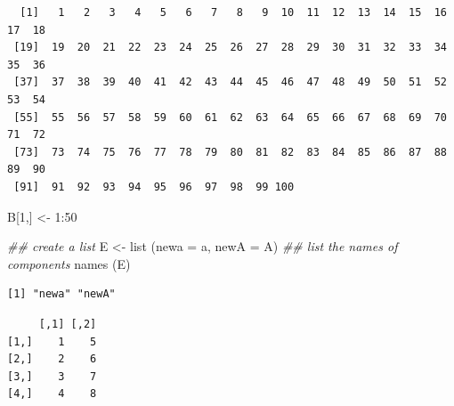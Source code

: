 \documentclass[
  letterpaper,
]{scrbook}
\newenvironment{Shaded}{\begin{snugshade}}{\end{snugshade}}
\newcommand{\AttributeTok}[1]{\textcolor[rgb]{0.40,0.45,0.13}{#1}}
\newcommand{\DecValTok}[1]{\textcolor[rgb]{0.68,0.00,0.00}{#1}}
\newcommand{\DocumentationTok}[1]{\textcolor[rgb]{0.37,0.37,0.37}{\textit{#1}}}
\newcommand{\FunctionTok}[1]{\textcolor[rgb]{0.28,0.35,0.67}{#1}}
\newcommand{\NormalTok}[1]{\textcolor[rgb]{0.00,0.23,0.31}{#1}}
\newcommand{\OtherTok}[1]{\textcolor[rgb]{0.00,0.23,0.31}{#1}}
\newcommand{\SpecialCharTok}[1]{\textcolor[rgb]{0.37,0.37,0.37}{#1}}
\newcommand{\StringTok}[1]{\textcolor[rgb]{0.13,0.47,0.30}{#1}}
\begin{document}
\begin{verbatim}
  [1]   1   2   3   4   5   6   7   8   9  10  11  12  13  14  15  16  17  18
 [19]  19  20  21  22  23  24  25  26  27  28  29  30  31  32  33  34  35  36
 [37]  37  38  39  40  41  42  43  44  45  46  47  48  49  50  51  52  53  54
 [55]  55  56  57  58  59  60  61  62  63  64  65  66  67  68  69  70  71  72
 [73]  73  74  75  76  77  78  79  80  81  82  83  84  85  86  87  88  89  90
 [91]  91  92  93  94  95  96  97  98  99 100
\end{verbatim}

\begin{Shaded}
\begin{Highlighting}[]
\NormalTok{B[}\DecValTok{1}\NormalTok{,] }\OtherTok{\textless{}{-}} \DecValTok{1}\SpecialCharTok{:}\DecValTok{50}


\DocumentationTok{\#\# create a list}
\NormalTok{E }\OtherTok{\textless{}{-}} \FunctionTok{list}\NormalTok{ (}\AttributeTok{newa =}\NormalTok{ a, }\AttributeTok{newA =}\NormalTok{ A)}
\DocumentationTok{\#\# list the names of components}
\FunctionTok{names}\NormalTok{ (E)}
\end{Highlighting}
\end{Shaded}

\begin{verbatim}
[1] "newa" "newA"
\end{verbatim}

\begin{Shaded}
\end{Shaded}

\begin{verbatim}
     [,1] [,2]
[1,]    1    5
[2,]    2    6
[3,]    3    7
[4,]    4    8
\end{verbatim}

\begin{Shaded}
\end{Shaded}
\end{document}
